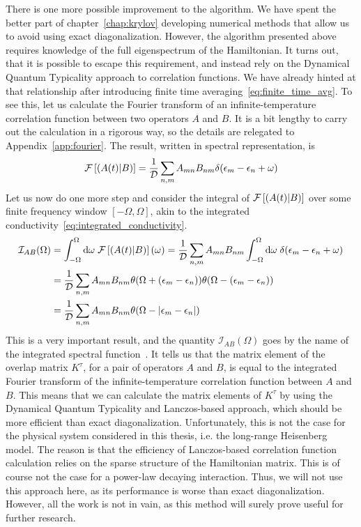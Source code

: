   There is one more possible improvement to the algorithm. We have spent the better part of chapter~\ref{chap:krylov}
developing numerical methods that allow us to avoid using exact diagonalization. However, the algorithm presented
above requires knowledge of the full eigenspectrum of the Hamiltonian. It turns out, that it is possible
to escape this requirement, and instead rely on the Dynamical Quantum Typicality approach to correlation functions.
We have already hinted at that relationship after introducing finite time averaging~\eqref{eq:finite_time_avg}.
To see this, let us calculate the Fourier transform of an infinite-temperature correlation function between
two operators \(A\) and \(B\). It is a bit lengthy to carry out the calculation in a rigorous way, so the
details are relegated to Appendix~\ref{app:fourier}. The result, written in spectral representation, is
\begin{equation}  
  \mathcal{F}\left[\left(A(t) \middle| B\right)\right] = \frac{1}{\mathcal{D}}\sum_{n,m} A_{mn} B_{nm} \delta(\epsilon_m-\epsilon_n+\omega)
  \label{eq:fourier_corr}
\end{equation}
Let us now do one more step and consider the integral of \(\mathcal{F}\left[\left(A(t) \middle| B\right)\right]\) over
some finite frequency window \([-\Omega, \Omega]\), akin to the integrated conductivity~\eqref{eq:integrated_conductivity}.
\begin{align}
    \mathcal{I}_{AB}(\Omega) &= \int_{-\Omega}^{\Omega} \mathrm{d}\omega\; \mathcal{F}\left[\left(A(t) \middle| B\right)\right](\omega) =
    \frac{1}{\mathcal{D}}\sum_{n,m} A_{mn} B_{nm} \int_{-\Omega}^{\Omega} \mathrm{d}\omega \;
    \delta(\epsilon_m-\epsilon_n+\omega) \nonumber \\ &= \frac{1}{\mathcal{D}}\sum_{n,m} A_{mn} B_{nm}
    \theta(\Omega + (\epsilon_m-\epsilon_n))\theta(\Omega - (\epsilon_m-\epsilon_n)) \nonumber\\
    &= \frac{1}{\mathcal{D}}\sum_{n,m} A_{mn} B_{nm}\theta(\Omega - \abs{\epsilon_m-\epsilon_n})
    \label{eq:integrated_spectral}
\end{align}
This is a very important result, and the quantity \(\mathcal{I}_{AB}(\Omega)\) goes by the name of
the integrated spectral function~\autocite{Vidmar2021}.
It tells us that the matrix element of the overlap matrix \(K^{\tau}\),
for a pair of operators \(A\) and \(B\), is equal to the integrated Fourier transform of the infinite-temperature
correlation function between \(A\) and \(B\). This means that we can calculate the matrix elements of \(K^{\tau}\)
by using the Dynamical Quantum Typicality and Lanczos-based approach, which should be more efficient than exact diagonalization.
Unfortunately, this is not the case for the  physical system considered in this thesis,
i.e. the long-range Heisenberg model. The reason is that the efficiency of Lanczos-based
correlation function calculation relies on the sparse structure of the Hamiltonian matrix.
This is of course not the case for a power-law decaying interaction. Thus, we will not use this approach
here, as its performance is worse than exact diagonalization. However, all the work is not in vain, as this method will surely prove useful
for further research.

